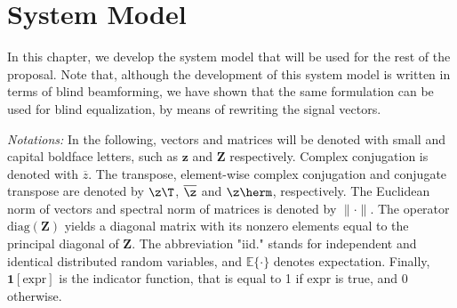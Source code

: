 \chapter{System Model}
\label{chap:model}

In this chapter, we develop the system model that will be used for the rest of the proposal. Note that, although the development of this system model is written in terms of blind beamforming, we have shown that the same formulation can be used for blind equalization, by means of rewriting the signal vectors.

\textit{Notations:} In the following, vectors and matrices will be denoted with small and capital boldface letters, such as $\bm{z}$ and $\bm{Z}$ respectively. %
Complex conjugation is denoted with $\overline{z}$. The transpose, element-wise complex conjugation and conjugate transpose are denoted by $\z\T$, $\overline{\z}$ and $\z\herm$, respectively. The Euclidean norm of vectors and spectral norm of matrices is denoted by $\|\cdot\|$. The operator $\mathrm{diag}(\bm{Z})$ yields a diagonal matrix with its nonzero elements equal to the principal diagonal of $\bm{Z}$. The abbreviation "iid." stands for independent and identical distributed random variables, and $\mathbb{E}\{\cdot\}$ denotes expectation. Finally, $\bm{1}[\mathrm{expr}]$ is the indicator function, that is equal to 1 if $\mathrm{expr}$ is true, and 0 otherwise.

